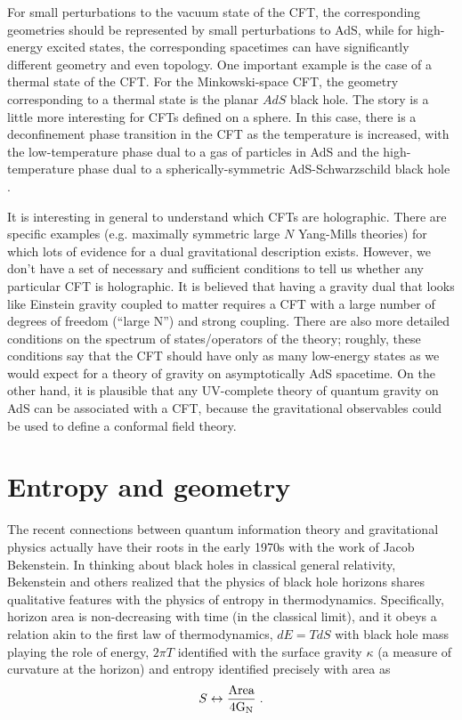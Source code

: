 \documentclass[12pt,epsf]{article}
\newcommand{\be}{\begin{equation}}
\newcommand{\ee}{\end{equation}}
\begin{document}
For small perturbations to the vacuum state of the CFT, the corresponding geometries should be represented by small perturbations to AdS, while for high-energy excited states, the corresponding spacetimes can have significantly different geometry and even topology. One important example is the case of a thermal state of the CFT. For the Minkowski-space CFT, the geometry corresponding to a thermal state is the planar $AdS$ black hole. The story is a little more interesting for CFTs defined on a sphere. In this case, there is a deconfinement phase transition in the CFT as the temperature is increased, with the low-temperature phase dual to a gas of particles in AdS and the high-temperature phase dual to a spherically-symmetric AdS-Schwarzschild black hole \cite{Witten:1998zw}.

It is interesting in general to understand which CFTs are holographic. There are specific examples (e.g. maximally symmetric large $N$ Yang-Mills theories) for which lots of evidence for a dual gravitational description exists. However, we don't have a set of necessary and sufficient conditions to tell us whether any particular CFT is holographic. It is believed that having a gravity dual that looks like Einstein gravity coupled to matter requires a CFT with a large number of degrees of freedom (``large N'') and strong coupling. There are also more detailed conditions on the spectrum of states/operators of the theory; roughly, these conditions say that the CFT should have only as many low-energy states as we would expect for a theory of gravity on asymptotically AdS spacetime.  On the other hand, it is plausible that any UV-complete theory of quantum gravity on AdS can be associated with a CFT, because the gravitational observables could be used to define a conformal field theory.

\section{Entropy and geometry}

The recent connections between quantum information theory and gravitational physics actually have their roots in the early 1970s with the work of Jacob Bekenstein. In thinking about black holes in classical general relativity, Bekenstein and others \cite{bekenstein1973black,bardeen1973four} realized that the physics of black hole horizons shares qualitative features with the physics of entropy in thermodynamics. Specifically, horizon area is non-decreasing with time (in the classical limit), and it obeys a relation akin to the first law of thermodynamics, $dE = T dS$ with black hole mass playing the role of energy, $2 \pi T$ identified with the surface gravity $\kappa$ (a measure of curvature at the horizon) and entropy identified precisely with area as
\be
\label{entropy_area}
S \leftrightarrow {\rm Area \over 4 G_N} \; .
\ee
\end{document}
